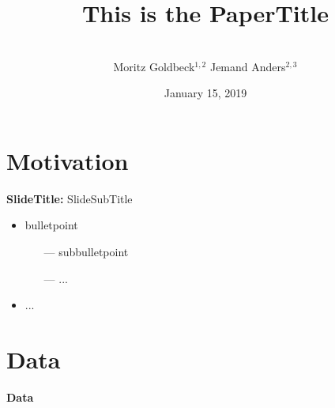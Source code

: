 \documentclass{beamer} %
\title{\textbf{This is the PaperTitle}}
\author{\\
		Moritz Goldbeck{\footnotesize$^{1,2}$}\quad
		Jemand Anders{\footnotesize$^{2,3}$}}
\institute{$^1$University of Munich\quad
		   $^2$ifo Institute\quad
		   $^3$CESifo}
\date{\footnotesize January 15, 2019}
\begin{document}
	\frame[plain]{\titlepage}




\section{Motivation}

\begin{frame}{\textbf{SlideTitle:} SlideSubTitle}
	\begin{itemize}
	    \item bulletpoint
    	\begin{itemize}
    	    \item[---] subbulletpoint
    	    \item[---] ...
    	\end{itemize}
    	\item ...
	\end{itemize}
\end{frame}

\section{Data}

{
	\begin{frame}[plain]		
	\vspace{1cm}
	{\color{white}\LARGE \textbf{Data}}
\end{frame}
}
\end{document}
